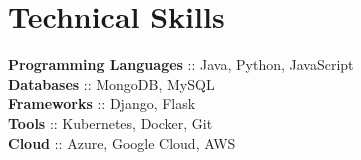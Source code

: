 
\section{Technical Skills}
    \begin{itemize}[leftmargin=0.15in, label={}]
    \small{
    \item{
    
        \textbf{ Programming Languages }:{: Java, Python, JavaScript } \\
    
        \textbf{ Databases }:{: MongoDB, MySQL } \\
    
        \textbf{ Frameworks }:{: Django, Flask } \\
    
        \textbf{ Tools }:{: Kubernetes, Docker, Git } \\
    
        \textbf{ Cloud }:{: Azure, Google Cloud, AWS } \\
    
    }}
    \end{itemize}